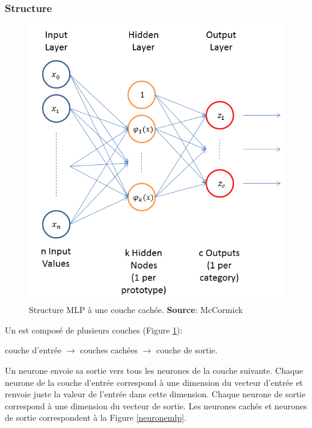 \subsubsection{Structure}
\begin{figure}
 \centering
 \includegraphics[scale=0.5]{../figures/nnstruct.png}
 \caption{Structure MLP à une couche cachée. \textbf{Source}: McCormick\cite{RBFtuto}}
 \label{structuremlp}
\end{figure}
Un \mlp est composé de plusieurs couches (Figure \ref{structuremlp}):
\begin{center}
 couche d'entrée $\rightarrow$ couches cachées $\rightarrow$ couche de sortie.
\end{center}
Un neurone envoie sa sortie vers tous les neurones de la couche suivante.
Chaque neurone de la couche d'entrée correspond à une dimension du vecteur d'entrée et renvoie juste la valeur de l'entrée dans cette dimension.
Chaque neurone de sortie correspond à une dimension du vecteur de sortie.
Les neurones cachés et neurones de sortie correspondent à la Figure \ref{neuronemlp}.
